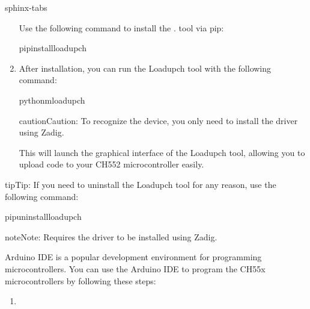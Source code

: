 \documentclass[letterpaper,10pt,english]{sphinxmanual}
\begin{document}
\begin{sphinxuseclass}{sphinx-tabs}
\begin{enumerate}
\sphinxAtStartPar
Use the following command to install the . tool via pip:

\begin{sphinxVerbatim}[commandchars=\\\{\}]
pipinstallloadupch
\end{sphinxVerbatim}

\item {} 
\sphinxAtStartPar
{}

\sphinxAtStartPar
After installation, you can run the Loadupch tool with the following command:

\begin{sphinxVerbatim}[commandchars=\\\{\}]
python\PYGZhy{}mloadupch
\end{sphinxVerbatim}

\begin{sphinxadmonition}{caution}{Caution:}
\sphinxAtStartPar
To recognize the device, you only need to install the  driver using Zadig.
\end{sphinxadmonition}

\sphinxAtStartPar
This will launch the graphical interface of the Loadupch tool, allowing you to upload code to your CH552 microcontroller easily.

\end{enumerate}

\begin{sphinxadmonition}{tip}{Tip:}
\sphinxAtStartPar
If you need to uninstall the Loadupch tool for any reason, use the following command:

\begin{sphinxVerbatim}[commandchars=\\\{\}]
pipuninstallloadupch
\end{sphinxVerbatim}
\end{sphinxadmonition}

\begin{sphinxadmonition}{note}{Note:}
\sphinxAtStartPar
Requires the  driver to be installed using Zadig.
\end{sphinxadmonition}

\sphinxAtStartPar
{}

\sphinxAtStartPar
Arduino IDE is a popular development environment for programming microcontrollers.
You can use the Arduino IDE to program the CH55x microcontrollers by following these steps:
\begin{enumerate}
%
\item {} 
\sphinxAtStartPar
{}


\end{enumerate}
\end{sphinxuseclass}
\end{document}
